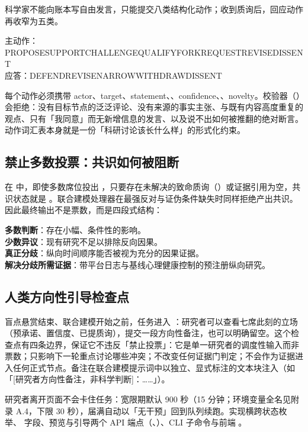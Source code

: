 科学家不能向账本写自由发言，只能提交八类结构化动作；收到质询后，回应动作再收窄为五类。

\begin{center}\small
\begin{tcolorbox}[colback=panel, colframe=linegray, boxrule=0.6pt, arc=2pt, left=8pt,right=8pt,top=6pt,bottom=6pt, fontupper=\ttfamily]
主动作：PROPOSE\quad SUPPORT\quad CHALLENGE\quad QUALIFY\quad FORK\quad REQUEST\quad REVISE\quad DISSENT\\[3pt]
应答：DEFEND\quad REVISE\quad NARROW\quad WITHDRAW\quad DISSENT
\end{tcolorbox}
\end{center}

每个动作必须携带 actor、target、statement、、confidence、、novelty。校验器（）会拒绝：没有目标节点的泛泛评论、没有来源的事实主张、与既有内容高度重复的观点、只有「我同意」而无新增信息的发言、以及说不出如何被推翻的绝对断言。动作词汇表本身就是一份「科研讨论该长什么样」的形式化约束。

\subsection{禁止多数投票：共识如何被阻断}

在  中，即使多数席位投出 ，只要存在未解决的致命质询（）或证据引用为空，共识状态就是 。联合建模处理器在最强反对与证伪条件缺失时同样拒绝产出共识。因此最终输出不是票数，而是四段式结构：

\begin{mechbox}
\textbf{多数判断}：存在小幅、条件性的影响。\\
\textbf{少数异议}：现有研究不足以排除反向因果。\\
\textbf{真正分歧}：纵向时间顺序能否被视为充分的因果证据。\\
\textbf{解决分歧所需证据}：带平台日志与基线心理健康控制的预注册纵向研究。
\end{mechbox}

\subsection{人类方向性引导检查点}

盲点悬赏结束、联合建模开始之前，任务进入 ：研究者可以查看七席此刻的立场（预承诺、置信度、已提质询），提交一段方向性备注，也可以明确留空。这个检查点有四条边界，保证它不违反「禁止投票」：它是单一研究者的调度性输入而非票数；只影响下一轮重点讨论哪些冲突；不改变任何证据门判定；不会作为证据进入任何正式节点。备注在联合建模提示词中以独立、显式标注的文本块注入（如「[研究者方向性备注，非科学判断]：……」）。

研究者离开页面不会卡住任务：宽限期默认 900 秒（15 分钟；环境变量全名见附录 A.4，下限 30 秒），届满自动以「无干预」回到队列续跑。实现横跨状态枚举、 字段、预览与引导两个 API 端点（、）、CLI 子命令与前端 。
